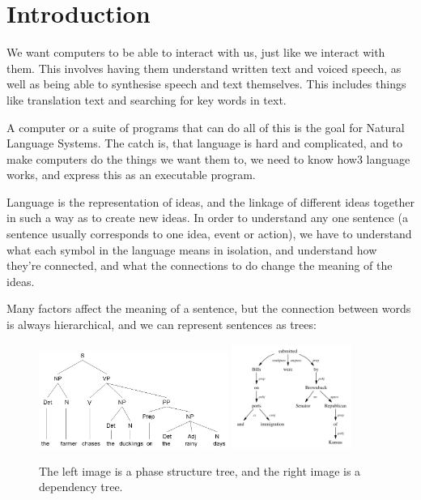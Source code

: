
\section{Introduction}

We want computers to be able to interact with us, just like we interact with
them. This involves having them understand written text and voiced speech, as
well as being able to synthesise speech and text themselves. This includes
things like translation text and searching for key words in text.

A computer or a suite of programs that can do all of this is the goal for
Natural Language Systems. The catch is, that language is hard and complicated,
and to make computers do the things we want them to, we need to know how3
language works, and express this as an executable program.

Language is the representation of ideas, and the linkage of different ideas
together in such a way as to create new ideas. In order to understand any one
sentence (a sentence usually corresponds to one idea, event or action), we have
to understand what each symbol in the language means in isolation, and
understand how they're connected, and what the connections to do change the
meaning of the ideas.

Many factors affect the meaning of a sentence, but the connection between words
is always hierarchical, and we can represent sentences as trees:

\begin{figure}[ht]
  \centering
  \includegraphics[width=0.55\textwidth]{images/phase-structure-tree}
  \includegraphics[width=0.35\textwidth]{images/dependency-tree}
  \caption{The left image is a phase structure tree, and the right image is a
  dependency tree.}
  \label{fig:trees}
\end{figure}

